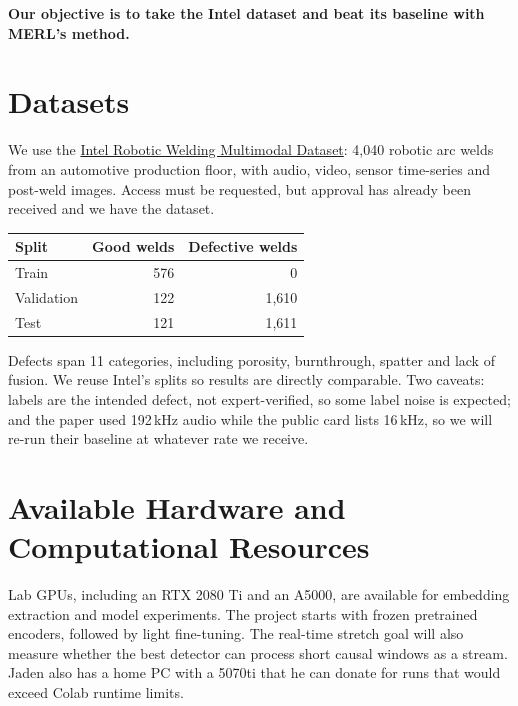 \documentclass[11pt]{article}
\begin{document}
\textbf{Our objective is to take the Intel dataset and beat its baseline with MERL's method.}

\section{Datasets}

We use the \href{https://huggingface.co/datasets/IntelLabs/Intel_Robotic_Welding_Multimodal_Dataset}{Intel Robotic Welding Multimodal Dataset}: 4,040 robotic arc welds from an automotive production floor, with audio, video, sensor time-series and post-weld images. Access must be requested, but approval has already been received and we have the dataset.

\begin{center}
\begin{tabular}{lrr}
    \toprule
    \textbf{Split} & \textbf{Good welds} & \textbf{Defective welds} \\
    \midrule
    Train & 576 & 0 \\
    Validation & 122 & 1,610 \\
    Test & 121 & 1,611 \\
    \bottomrule
\end{tabular}
\end{center}

Defects span 11 categories, including porosity, burnthrough, spatter and lack of fusion. We reuse Intel's splits so results are directly comparable. Two caveats: labels are the intended defect, not expert-verified, so some label noise is expected; and the paper used 192\,kHz audio while the public card lists 16\,kHz, so we will re-run their baseline at whatever rate we receive.

\section{Available Hardware and Computational Resources}

Lab GPUs, including an RTX 2080 Ti and an A5000, are available for embedding extraction and model experiments. The project starts with frozen pretrained encoders, followed by light fine-tuning. The real-time stretch goal will also measure whether the best detector can process short causal windows as a stream. Jaden also has a home PC with a 5070ti that he can donate for runs that would exceed Colab runtime limits.
\end{document}

